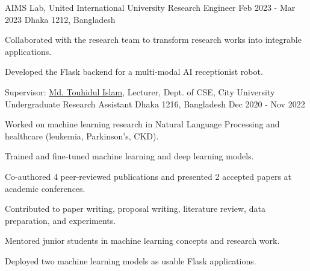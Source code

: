\begin{cventries}


\cventry
  {AIMS Lab, United International University} %
  {Research Engineer} %
  {Feb 2023 - Mar 2023} %
  {Dhaka 1212, Bangladesh} %
{
  \begin{cvitems}
    \item{Collaborated with the research team to transform research works into integrable applications.}
    \item{Developed the Flask backend for a multi-modal AI receptionist robot.}
  \end{cvitems}
}




\cventry
  {Supervisor: \href{https://www.linkedin.com/in/touhid000/}{Md. Touhidul Islam}, Lecturer, Dept. of CSE, City University} %
  {Undergraduate Research Assistant} %
  {Dhaka 1216, Bangladesh} %
  {Dec 2020 - Nov 2022} %
  {
    \begin{cvitems} %
      \item{Worked on machine learning research in Natural Language Processing and healthcare (leukemia, Parkinson's, CKD).}
      \item{Trained and fine-tuned machine learning and deep learning models.}
      \item{Co-authored 4 peer-reviewed publications and presented 2 accepted papers at academic conferences.}
      \item{Contributed to paper writing, proposal writing, literature review, data preparation, and experiments.}
      \item{Mentored junior students in machine learning concepts and research work.}
      \item{Deployed two machine learning models as usable Flask applications.}
    \end{cvitems}
  }
  

\end{cventries}
